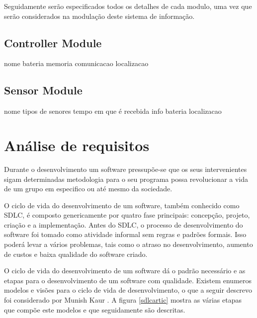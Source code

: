 Seguidamente serão especificados todos os detalhes de cada modulo, uma vez que serão considerados na modulação deste sistema de informação. 

\subsection{Controller Module}

nome
bateria
memoria
comunicacao
localizacao


\subsection{Sensor Module}


nome
tipos de senores 
tempo em que é recebida info 
bateria
localizacao



\newpage







\section{Análise de requisitos}

Durante o desenvolvimento um software pressupõe-se que os seus intervenientes sigam determinadas metodologia para o seu programa possa revolucionar a vida de um grupo em especifico ou até mesmo da sociedade. 


O ciclo de vida do desenvolvimento de um software, também conhecido como \ac{SDLC}, é composto genericamente por quatro fase principais: concepção, projeto, criação e a implementação. Antes do \ac{SDLC}, o processo de desenvolvimento do software foi tomado como atividade informal sem regras e padrões formais. Isso poderá levar a vários problemas, tais como o atraso no desenvolvimento, aumento de custos e baixa qualidade do software criado. 

O ciclo de vida do desenvolvimento de um software dá o padrão necessário e as etapas para o desenvolvimento de um software com qualidade. Existem enumeros modelos e visões para o ciclo de vida de desenvolvimento, o que a seguir descrevo foi considerado por Munish Kaur \cite{Saini2014}. A figura \ref{sdlcartic} mostra as várias etapas que compõe este modelos e que seguidamente são descritas. 


